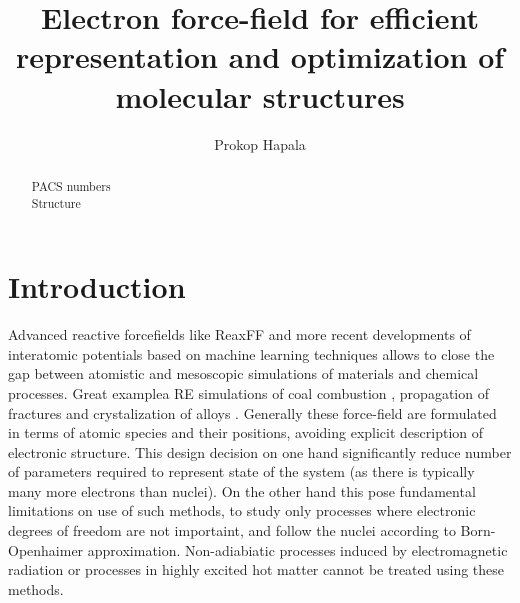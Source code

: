\documentclass[%
 reprint,
 amsmath,amssymb,
prb,
]{revtex4-1}
\begin{document}

\title{ Electron force-field for efficient representation and optimization of molecular structures }

\author{Prokop Hapala}

\begin{abstract}



\begin{description}
\item[PACS numbers]
\item[Structure]
\end{description}
\end{abstract}

\maketitle

\tableofcontents

\section{Introduction}

Advanced reactive forcefields like ReaxFF and more recent developments of interatomic potentials based on machine learning techniques allows to close the gap between atomistic and mesoscopic simulations of materials and chemical processes. Great examplea RE simulations of coal combustion \cite{}, propagation of fractures \cite{} and crystalization of alloys \cite{}. Generally these force-field are formulated in terms of atomic species and their positions, avoiding explicit description of electronic structure. This design decision on one hand significantly reduce number of parameters required to represent state of the system (as there is typically many more electrons than nuclei). On the other hand this pose fundamental limitations on use of such methods, to study only processes where electronic degrees of freedom are not importaint, and follow the nuclei according to Born-Openhaimer approximation. Non-adiabiatic processes induced by electromagnetic radiation or processes in highly excited hot matter cannot be treated using these methods. 
\end{document}
